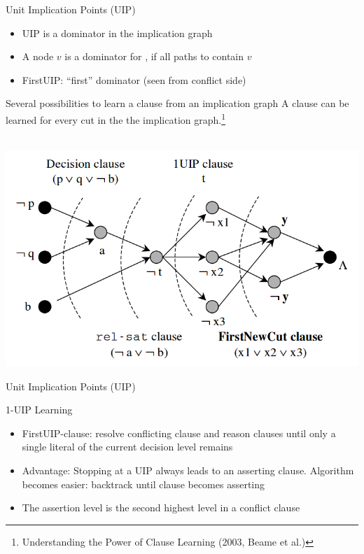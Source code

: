 \documentclass[t]{sdqbeamer}
\begin{document}
\begin{frame}{Unit Implication Points (UIP)}
\begin{itemize}
	\item UIP is a dominator in the implication graph
	\item A node $v$ is a dominator for \blitz, if all paths to \blitz contain $v$
	\item FirstUIP: ``first'' dominator (seen from conflict side)
\end{itemize}

\begin{exampleblock}{Several possibilities to learn a clause from an implication graph}
A clause can be learned for every cut in the the implication graph.\footnote{Understanding the Power of Clause Learning (2003, Beame et al.)}%
\begin{center}%
~\\[-2em]
\includegraphics[width=.5\linewidth]{figures/l04/implicationgraphcuts.png}
\end{center}
\end{exampleblock}%
\end{frame}
			
			
\begin{frame}{Unit Implication Points (UIP)}
\begin{block}{1-UIP Learning}
\begin{itemize}
\item FirstUIP-clause: resolve conflicting clause and reason clauses until only a single literal of the current decision level remains 
\item Advantage: Stopping at a UIP always leads to an asserting clause. Algorithm becomes easier: backtrack until clause becomes asserting
\item The assertion level is the second highest level in a conflict clause
\end{itemize}
\end{block}
\end{frame}
\end{document}
